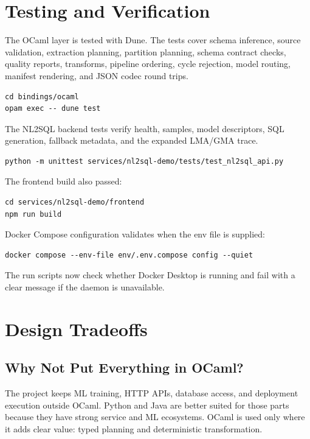 \documentclass[conference]{IEEEtran}
\begin{document}
\section{Testing and Verification}

The OCaml layer is tested with Dune. The tests cover schema inference, source
validation, extraction planning, partition planning, schema contract checks,
quality reports, transforms, pipeline ordering, cycle rejection, model routing,
manifest rendering, and JSON codec round trips.

\begin{lstlisting}[style=dagents]
cd bindings/ocaml
opam exec -- dune test
\end{lstlisting}

The NL2SQL backend tests verify health, samples, model descriptors, SQL
generation, fallback metadata, and the expanded LMA/GMA trace.

\begin{lstlisting}[style=dagents]
python -m unittest services/nl2sql-demo/tests/test_nl2sql_api.py
\end{lstlisting}

The frontend build also passed:

\begin{lstlisting}[style=dagents]
cd services/nl2sql-demo/frontend
npm run build
\end{lstlisting}

Docker Compose configuration validates when the env file is supplied:

\begin{lstlisting}[style=dagents]
docker compose --env-file env/.env.compose config --quiet
\end{lstlisting}

The run scripts now check whether Docker Desktop is running and fail with a
clear message if the daemon is unavailable.

\section{Design Tradeoffs}

\subsection{Why Not Put Everything in OCaml?}

The project keeps ML training, HTTP APIs, database access, and deployment
execution outside OCaml. Python and Java are better suited for those parts
because they have strong service and ML ecosystems. OCaml is used only where it
adds clear value: typed planning and deterministic transformation.
\end{document}

